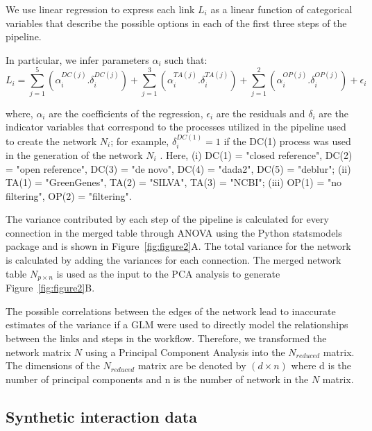   We use linear regression to express each link $L_i$ as a linear function of categorical variables that describe the possible options in each of the first three steps of the pipeline.

  In particular, we infer parameters $\alpha_i$ such that:
   \begin{equation*}
       L_i = \sum_{j=1}^5 \left( \alpha^{DC(j)}_i.\delta^{DC(j)}_i \right) +
             \sum_{j=1}^3 \left( \alpha^{TA(j)}_i.\delta^{TA(j)}_i \right) +
             \sum_{j=1}^2 \left( \alpha^{OP(j)}_i.\delta^{OP(j)}_i \right) +
             \epsilon_i
   \end{equation*}

   where, $\alpha_i$ are the coefficients of the regression, $\epsilon_i$ are the residuals and $\delta_i$ are the indicator variables that correspond to the processes utilized in the pipeline used to create the network $N_i$; for example, $\delta^{DC(1)}_i = 1$ if the DC(1) process was used in the generation of the network $N_i$ .
   Here, (i) DC(1) = "closed reference", DC(2) = "open reference", DC(3) = "de novo", DC(4) = "dada2", DC(5) = "deblur"; (ii)  TA(1) = "GreenGenes", TA(2) = "SILVA", TA(3) = "NCBI"; (iii) OP(1) = "no filtering", OP(2) = "filtering".

  The variance contributed by each step of the pipeline is calculated for every connection in the merged table through ANOVA using the Python statsmodels package and is shown in Figure~\ref{fig:figure2}A.
  The total variance for the network is calculated by adding the variances for each connection.
  The merged network table $N_{p \times n}$ is used as the input to the PCA analysis to generate Figure~\ref{fig:figure2}B.
  
  The possible correlations between the edges of the network lead to inaccurate estimates of the variance if a GLM were used to directly model the relationships between the links and steps in the workflow. Therefore, we transformed the network matrix $N$ using a Principal Component Analysis into the $N_{reduced}$ matrix. The dimensions of the $N_{reduced}$ matrix are be denoted by $(d \times n)$ where d is the number of principal components and n is the number of network in the $N$ matrix.



  \subsection*{Synthetic interaction data}
  \vspace{-5mm}

